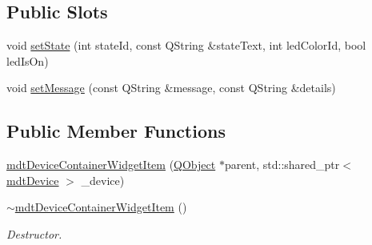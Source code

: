 \subsection*{Public Slots}
\begin{DoxyCompactItemize}
\item 
void \hyperlink{classmdt_device_container_widget_private_1_1mdt_device_container_widget_item_a32b7de5ce79a78f6467ae0a6709ec639}{set\-State} (int state\-Id, const Q\-String \&state\-Text, int led\-Color\-Id, bool led\-Is\-On)
\item 
void \hyperlink{classmdt_device_container_widget_private_1_1mdt_device_container_widget_item_addae6dbcc3a22c35d3dddbef53393182}{set\-Message} (const Q\-String \&message, const Q\-String \&details)
\end{DoxyCompactItemize}
\subsection*{Public Member Functions}
\begin{DoxyCompactItemize}
\item 
\hyperlink{classmdt_device_container_widget_private_1_1mdt_device_container_widget_item_a6d0934e0675ea7bfe1a3d4b3e5e28e68}{mdt\-Device\-Container\-Widget\-Item} (\hyperlink{class_q_object}{Q\-Object} $\ast$parent, std\-::shared\-\_\-ptr$<$ \hyperlink{classmdt_device}{mdt\-Device} $>$ \-\_\-device)
\item 
\hyperlink{classmdt_device_container_widget_private_1_1mdt_device_container_widget_item_a2c816807e58d3f127a7a9757020db828}{$\sim$mdt\-Device\-Container\-Widget\-Item} ()
\begin{DoxyCompactList}\small\item\em Destructor. \end{DoxyCompactList}\end{DoxyCompactItemize}
